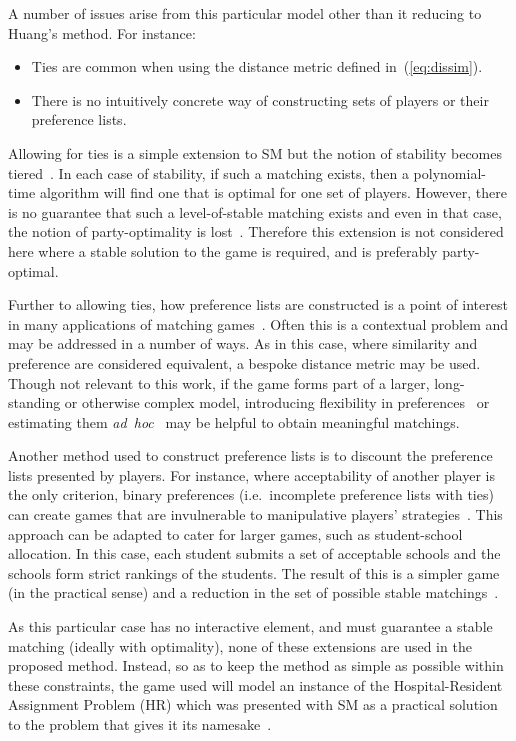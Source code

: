 A number of issues arise from this particular model other than it reducing to
Huang's method. For instance:
\begin{itemize}
    \item Ties are common when using the distance metric defined
        in~(\ref{eq:dissim}).
    \item There is no intuitively concrete way of constructing sets of players
        or their preference lists.
\end{itemize}

Allowing for ties is a simple extension to SM but the notion of stability
becomes tiered~\cite{Manlove1999}. In each case of stability, if such a matching
exists, then a polynomial-time algorithm will find one that is optimal for one
set of players. However, there is no guarantee that such a level-of-stable
matching exists and even in that case, the notion of party-optimality is
lost~\cite{Erdil2017}. Therefore this extension is not considered here where a
stable solution to the game is required, and is preferably party-optimal.

Further to allowing ties, how preference lists are constructed is a point of
interest in many applications of matching games~\cite{Iwama2008}. Often this is
a contextual problem and may be addressed in a number of ways. As in this case,
where similarity and preference are considered equivalent, a bespoke distance
metric may be used. Though not relevant to this work, if the game forms part of
a larger, long-standing or otherwise complex model, introducing flexibility in
preferences~\cite{Agarwal2017,Menzel2015} or estimating them
\emph{ad~hoc}~\cite{Rastegari2016} may be helpful to obtain meaningful
matchings.

Another method used to construct preference lists is to discount the preference
lists presented by players. For instance, where acceptability of another player
is the only criterion, binary preferences (i.e.\ incomplete preference lists
with ties) can create games that are invulnerable to manipulative players'
strategies~\cite{Bogomolnaia2004}. This approach can be adapted to cater for
larger games, such as student-school allocation. In this case, each student
submits a set of acceptable schools and the schools form strict rankings of the
students. The result of this is a simpler game (in the practical sense) and a
reduction in the set of possible stable
matchings~\cite{Haeringer2014,Haeringer2019}.

As this particular case has no interactive element, and must guarantee a stable
matching (ideally with optimality), none of these extensions are used in the
proposed method. Instead, so as to keep the method as simple as possible within
these constraints, the game used will model an instance of the Hospital-Resident
Assignment Problem (HR) which was presented with SM as a practical solution to
the problem that gives it its namesake~\cite{Gale1962}.

